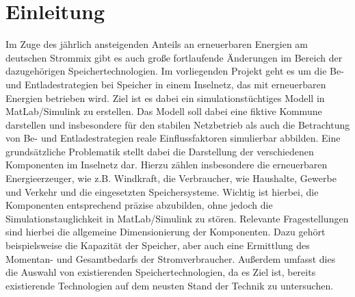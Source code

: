 \chapter{Einleitung}

Im Zuge des jährlich ansteigenden Anteils an erneuerbaren Energien am deutschen Strommix gibt es auch große fortlaufende Änderungen im Bereich der dazugehörigen Speichertechnologien. 
Im vorliegenden Projekt geht es um die Be- und Entladestrategien bei Speicher in einem Inselnetz, das mit erneuerbaren Energien betrieben wird. 
Ziel ist es dabei ein simulationstüchtiges Modell in MatLab/Simulink zu erstellen. 
Das Modell soll dabei eine fiktive Kommune darstellen und insbesondere für den stabilen Netzbetrieb als auch die Betrachtung von Be- und Entladestrategien reale Einflussfaktoren simulierbar abbilden.
Eine grundsätzliche Problematik stellt dabei die Darstellung der verschiedenen Komponenten im Inselnetz dar. 
Hierzu zählen insbesondere die erneuerbaren Energieerzeuger, wie z.B. Windkraft, die Verbraucher, wie Haushalte, Gewerbe und Verkehr und die eingesetzten Speichersysteme.
Wichtig ist hierbei, die Komponenten entsprechend präzise abzubilden, ohne jedoch die Simulationstauglichkeit in MatLab/Simulink zu stören.
Relevante Fragestellungen sind hierbei die allgemeine Dimensionierung der Komponenten. 
Dazu gehört beispielsweise die Kapazität der Speicher, aber auch eine Ermittlung des Momentan- und Gesamtbedarfs der Stromverbraucher.
Außerdem umfasst dies die Auswahl von existierenden Speichertechnologien, da es Ziel ist, bereits existierende Technologien auf dem neusten Stand der Technik zu untersuchen.

